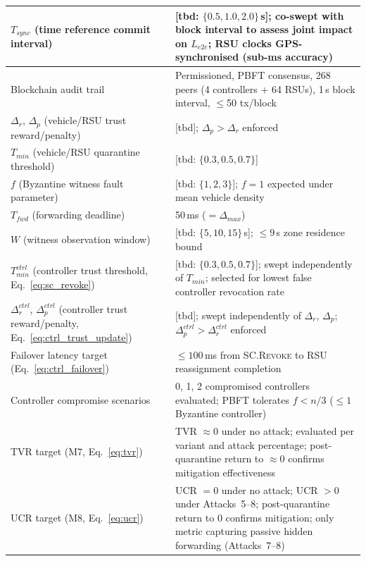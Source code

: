 \documentclass[12pt, a4paper]{report}
\begin{document}
{{\begin{longtable}{|m{5.0cm}|m{9.0cm}|}
            \hline
            $T_{sync}$ (time reference commit interval) & [tbd: $\{0.5, 1.0, 2.0\}$\,s]; co-swept with block interval to assess joint impact on $L_{e2e}$; RSU clocks GPS-synchronised (sub-ms accuracy) \\
            \hline
            Blockchain audit trail & Permissioned, PBFT consensus, 268 peers (4 controllers + 64 RSUs), 1\,s block interval, $\leq$50 tx/block \\
            \hline
            $\Delta_r$, $\Delta_p$ (vehicle/RSU trust reward/penalty) & [tbd]; $\Delta_p > \Delta_r$ enforced \\
            \hline
            $T_{min}$ (vehicle/RSU quarantine threshold) & [tbd: $\{0.3, 0.5, 0.7\}$] \\
            \hline
            $f$ (Byzantine witness fault parameter) & [tbd: $\{1, 2, 3\}$]; $f{=}1$ expected under mean vehicle density \\
            \hline
            $T_{fwd}$ (forwarding deadline) & 50\,ms ($= \Delta_{max}$) \\
            \hline
            $W$ (witness observation window) & [tbd: $\{5, 10, 15\}$\,s]; $\leq 9$\,s zone residence bound \\
                
    
             \hline
            $T_{min}^{ctrl}$ (controller trust threshold,
            Eq.~\ref{eq:sc_revoke}) &
            [tbd: $\{0.3, 0.5, 0.7\}$]; swept
            independently of $T_{min}$; selected for
            lowest false controller revocation rate \\
            \hline
            $\Delta_r^{ctrl}$, $\Delta_p^{ctrl}$
            (controller trust reward/penalty,
            Eq.~\ref{eq:ctrl_trust_update}) &
            [tbd]; swept independently of $\Delta_r$,
            $\Delta_p$; $\Delta_p^{ctrl} >
            \Delta_r^{ctrl}$ enforced \\
            \hline
            Failover latency target
            (Eq.~\ref{eq:ctrl_failover}) &
            $\leq 100$\,ms from \textsc{SC.Revoke}
            to RSU reassignment completion \\
            \hline
            Controller compromise scenarios &
            0, 1, 2 compromised controllers evaluated;
            PBFT tolerates $f < n/3$ ($\leq 1$
            Byzantine controller) \\
             \hline
          TVR target (M7, Eq.~\ref{eq:tvr}) &
          TVR $\approx 0$ under no attack;
          evaluated per variant and attack percentage;
          post-quarantine return to $\approx 0$
          confirms mitigation effectiveness \\
          \hline
          UCR target (M8, Eq.~\ref{eq:ucr}) &
          UCR $= 0$ under no attack;
          UCR $> 0$ under Attacks~5--8;
          post-quarantine return to 0 confirms
          mitigation; only metric capturing passive
          hidden forwarding (Attacks~7--8) \\
        


\end{longtable}}}
\end{document}
